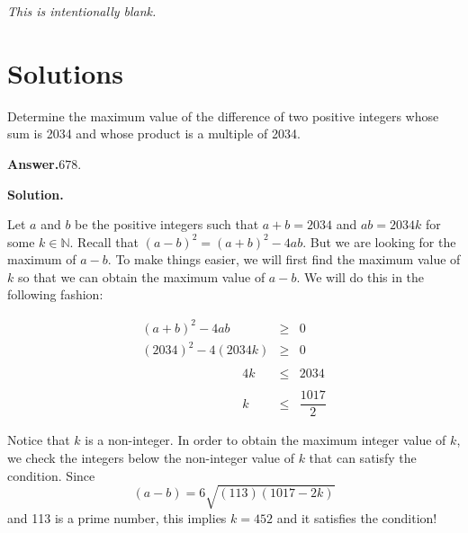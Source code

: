 \documentclass[12pt,paper=letter]{scrartcl}
\newcommand{\ans}[1]{{\sffamily \bfseries Answer.}\;\(\boxed{\text{#1}}\).}
\newcommand{\sol}{{\sffamily \bfseries Solution.}\;}
\begin{document}
\vspace{15cm}

\begin{center}
    {\Large \textit{This is intentionally blank.}}
\end{center}


\newpage

\section*{Solutions}

\vspace{1cm}

\begin{probboxed}
Determine the maximum value of the difference of two positive integers whose sum is 2034 and whose product is a multiple of 2034.
\end{probboxed}

\ans{678}

\sol

Let $a$ and $b$ be the positive integers such that $a+b=2034$ and $ab = 2034k$ for some $k \in \mathbb{N}$. Recall that $(a-b)^2 = (a+b)^2 - 4ab$. But we are looking for the maximum of $a-b$. To make things easier, we will first find the maximum value of $k$ so that we can obtain the maximum value of $a-b$. We will do this in the following fashion:

\begin{equation*}
    \begin{array}{lll}
         (a+b)^2 - 4ab & \geq & 0 \\
         (2034)^2 -4(2034k) & \geq & 0 \\
         \\
        \qquad \qquad \qquad \qquad 4k & \leq & 2034 \\
        
        \\
        
        
        \qquad \qquad \qquad \qquad k & \leq & \dfrac{1017}{2} 
    \end{array}
\end{equation*}

Notice that $k$ is a non-integer. In order to obtain the maximum integer value of $k$, we check the integers below the non-integer value of $k$ that can satisfy the condition. Since $$(a-b) = 6\sqrt{(113)(1017-2k)}$$ and 113 is a prime number, this implies $k =452$ and it satisfies the condition!

\vspace{2mm}
\end{document}
